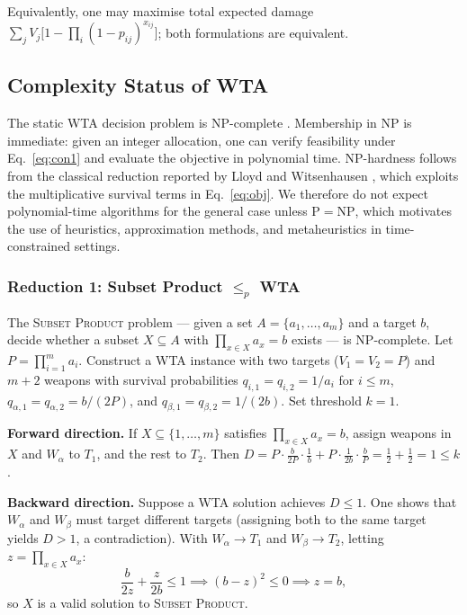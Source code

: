 \documentclass[10pt,conference]{IEEEtran}
\begin{document}
Equivalently, one may maximise total expected damage
$\sum_j V_j \bigl[1 - \prod_i (1-p_{ij})^{x_{ij}}\bigr]$; both formulations
are equivalent.

\subsection{Complexity Status of WTA}
\label{sec:npc}

The static WTA decision problem is NP-complete \cite{lloyd1986}.  Membership in
NP is immediate: given an integer allocation, one can verify feasibility under
Eq.~\ref{eq:con1} and evaluate the objective in polynomial time.
NP-hardness follows from the classical reduction reported by Lloyd and
Witsenhausen \cite{lloyd1986}, which exploits the multiplicative survival terms
in Eq.~\ref{eq:obj}.  We therefore do not expect polynomial-time algorithms for
the general case unless $\mathrm{P}=\mathrm{NP}$, which motivates the use of
heuristics, approximation methods, and metaheuristics in time-constrained
settings.

\iffalse

\subsubsection{Reduction 1: Subset Product $\leq_p$ WTA}

The \textsc{Subset Product} problem — given a set $A = \{a_1, \ldots, a_m\}$
and a target $b$, decide whether a subset $X \subseteq A$ with
$\prod_{x \in X} a_x = b$ exists — is NP-complete.
Let $P = \prod_{i=1}^m a_i$.
Construct a WTA instance with two targets ($V_1 = V_2 = P$) and $m+2$ weapons
with survival probabilities $q_{i,1} = q_{i,2} = 1/a_i$ for $i \leq m$,
$q_{\alpha,1} = q_{\alpha,2} = b/(2P)$, and $q_{\beta,1} = q_{\beta,2} = 1/(2b)$.
Set threshold $k = 1$.

\textbf{Forward direction.}
If $X \subseteq \{1,\ldots,m\}$ satisfies $\prod_{x\in X}a_x = b$, assign
weapons in $X$ and $W_\alpha$ to $T_1$, and the rest to $T_2$.  Then
$D = P \cdot \tfrac{b}{2P} \cdot \tfrac{1}{b} + P \cdot \tfrac{1}{2b} \cdot
\tfrac{b}{P} = \tfrac12 + \tfrac12 = 1 \leq k$. \checkmark

\textbf{Backward direction.}
Suppose a WTA solution achieves $D \leq 1$.
One shows that $W_\alpha$ and $W_\beta$ must target different targets (assigning
both to the same target yields $D > 1$, a contradiction).
With $W_\alpha \to T_1$ and $W_\beta \to T_2$, letting $z = \prod_{x\in X}a_x$:
\[
  \frac{b}{2z} + \frac{z}{2b} \leq 1 \implies (b-z)^2 \leq 0 \implies z = b,
\]
so $X$ is a valid solution to \textsc{Subset Product}. \checkmark
\end{document}
